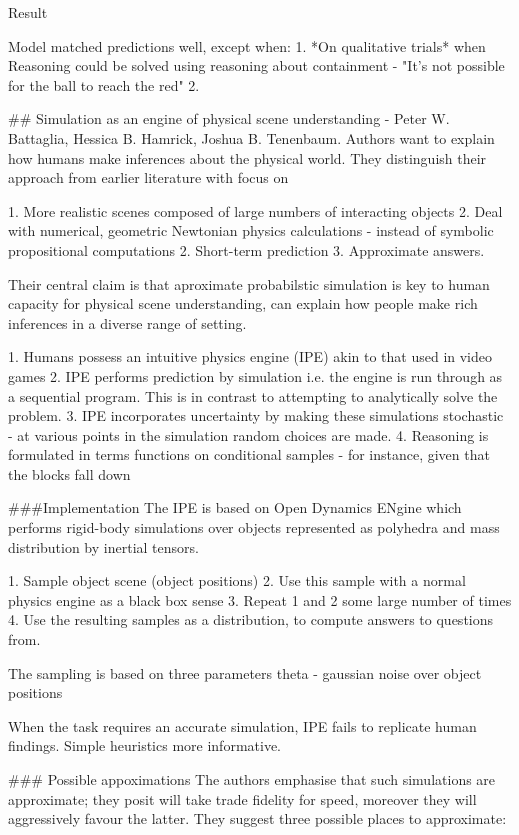 \documentclass{tlp}
\begin{document}
Result

Model matched predictions well, except when:
1. *On qualitative trials* when Reasoning could be solved using reasoning about containment - "It's not possible for the ball to reach the red"
2. 

## Simulation as an engine of physical scene understanding - Peter W. Battaglia, Hessica B. Hamrick, Joshua B. Tenenbaum.
Authors want to explain how humans make inferences about the physical world.
They distinguish their approach from earlier literature with focus on

1. More realistic scenes composed of large numbers of interacting objects
2. Deal with numerical, geometric Newtonian physics calculations - instead of symbolic propositional computations
2. Short-term prediction
3. Approximate answers.

Their central claim is that aproximate probabilstic simulation is key to human capacity for physical scene understanding, can explain how people make rich inferences in a diverse range of setting.
 
1. Humans possess an intuitive physics engine (IPE) akin to that used in video games
2. IPE performs prediction by simulation i.e. the engine is run through as a sequential program.  This is in contrast to attempting to analytically solve the problem.
3. IPE incorporates uncertainty by making these simulations stochastic - at various points in the simulation random choices are made.
4. Reasoning is formulated in terms functions on conditional samples - for instance, given that the blocks fall down

###Implementation
The IPE is based on Open Dynamics ENgine which performs rigid-body simulations over objects represented as polyhedra and mass distribution by inertial tensors.

1. Sample object scene (object positions)
2. Use this sample with a normal physics engine as a black box sense
3. Repeat 1 and 2 some large number of times
4. Use the resulting samples as a distribution, to compute answers to questions from.

The sampling is based on three parameters
theta - gaussian noise over object positions

When the task requires an accurate simulation, IPE fails to replicate human findings.  Simple heuristics more informative.

### Possible appoximations
The authors emphasise that such simulations are approximate; they posit will take trade fidelity for speed, moreover they will aggressively favour the latter.
They suggest three possible places to approximate:
\end{document}
